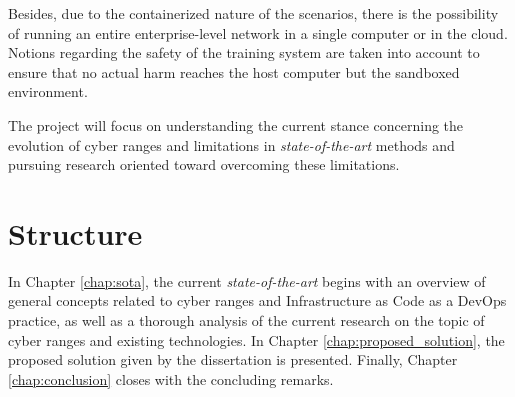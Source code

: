 Besides, due to the containerized nature of the scenarios, there is the possibility of running an entire enterprise-level network in a single computer or in the cloud. Notions regarding the safety of the training system are taken into account to ensure that no actual harm reaches the host computer but the sandboxed environment. 

The project will focus on understanding the current stance concerning the evolution of cyber ranges and limitations in \textit{state-of-the-art} methods and pursuing research oriented toward overcoming these limitations.

\section{Structure} \label{sec:structure}

In Chapter \ref{chap:sota}, the current \textit{state-of-the-art} begins with an overview of general concepts related to cyber ranges and Infrastructure as Code as a DevOps practice, as well as a thorough analysis of the current research on the topic of cyber ranges and existing technologies. In Chapter \ref{chap:proposed_solution}, the proposed solution given by the dissertation is presented. Finally, Chapter \ref{chap:conclusion} closes with the concluding remarks.
